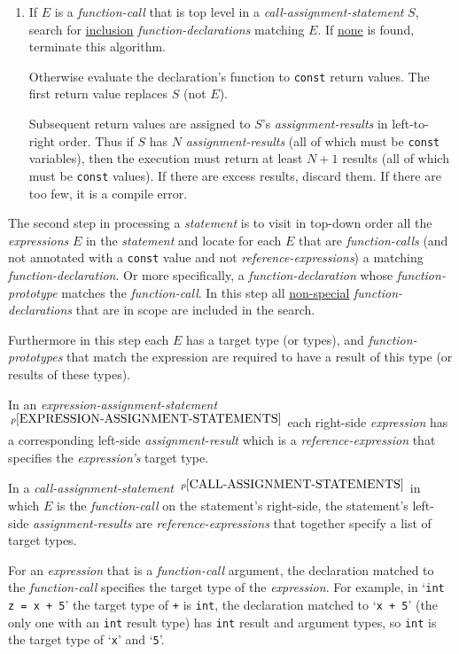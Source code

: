 \documentclass[12pt]{article}
\newcommand{\pagnote}[1]{$\,^{p\pageref{#1}}$}
\begin{document}
\begin{enumerate}
\item\label{INCLUSION-FUNCTION-STEP}
If $E$ is a {\em function-call}
that is top level in a {\em call-assignment-statement} $S$,
search for \underline{inclusion} {\em function-declarations}
matching $E$.  If \underline{none} is found, terminate this algorithm.

Otherwise evaluate the declaration's function to {\tt const} return values.
The first return value replaces $S$ (not $E$).

Subsequent return values are assigned to $S$'s {\em assignment-results}
in left-to-right order.
Thus if $S$
has $N$ {\em assignment-results} (all of which must be {\tt const} variables),
then the execution must return at
least $N+1$ results (all of which must be {\tt const} values).
If there are excess results, discard them.  If there are too few,
it is a compile error.

\end{enumerate}

The second step in processing a {\em statement} is to visit in top-down order
all the {\em expressions} $E$ in the {\em statement}
and locate for each $E$ that are {\em function-calls}
(and not annotated with a {\tt const} value and not {\em reference-expressions})
a matching {\em function-declaration}.  Or more specifically,
a {\em function-declaration} whose {\em function-prototype} matches
the {\em function-call}.  In this step all \underline{non-special}
{\em function-declarations} that are in scope are included in the search.

Furthermore in this step each $E$ has a target type (or types),
and {\em function-prototypes} that match the expression are required to
have a result of this type (or results of these types).

In an {\em expression-assignment-statement}%
\pagnote{EXPRESSION-ASSIGNMENT-STATEMENTS} each right-side {\em expression}
has a corresponding left-side {\em assignment-result} which is a
{\em reference-expression} that specifies
the {\em expression's} target type.

In a {\em call-assignment-statement}%
\pagnote{CALL-ASSIGNMENT-STATEMENTS} in which $E$ is the {\em function-call}
on the statement's right-side, the statement's
left-side {\em assignment-results} are {\em reference-expressions} that
together specify a list of target types.

For an {\em expression} that is a {\em function-call} argument,
the declaration matched to the {\em function-call} specifies the
target type of the {\em expression}.  For example, in
`{\tt int z = x + 5}' the target type of {\tt +} is {\tt int},
the declaration matched to `{\tt x +  5}' (the only one with an {\tt int}
result type) has {\tt int} result
and argument types, so {\tt int} is the target type of `{\tt x}' and `{\tt 5}'.
\end{document}
